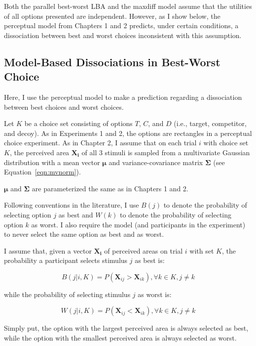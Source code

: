 Both the parallel best-worst LBA and the maxdiff model assume that the utilities of all options presented are independent. However, as I show below, the perceptual model from Chapters 1 and 2 predicts, under certain conditions, a dissociation between best and worst choices inconsistent with this assumption.

\subsection{Model-Based Dissociations in Best-Worst Choice}

Here, I use the perceptual model to make a prediction regarding a dissociation between best choices and worst choices. 

Let $K$ be a choice set consisting of options $T$, $C$, and $D$ (i.e., target, competitor, and decoy). As in Experiments 1 and 2, the options are rectangles in a perceptual choice experiment. As in Chapter 2, I assume that on each trial $i$ with choice set $K$, the perceived area $\mathbf{X_{i}}$ of all 3 stimuli is sampled from a multivariate Gaussian distribution with a mean vector $\boldsymbol{\mu}$ and variance-covariance matrix $\boldsymbol{\Sigma}$ (see Equation~\ref{eqn:mvnorm}).

$\boldsymbol{\mu}$ and $\boldsymbol{\Sigma}$ are parameterized the same as in Chapters 1 and 2. 

Following conventions in the literature, I use $B(j)$ to denote the probability of selecting option $j$ as best and $W(k)$ to denote the probability of selecting option $k$ as worst. I also require the model (and participants in the experiment) to never select the same option as best and as worst.

I assume that, given a vector $\mathbf{X_{i}}$ of perceived areas on trial $i$ with set $K$, the probability a participant selects stimulus $j$ as best is:

\begin{equation}
   B(j|i,K)=P(\mathbf{X}_{ij}>\mathbf{X}_{ik}), \forall k \in K, j \neq k
   \label{eqn:bchoice1}
\end{equation}

while the probability of selecting stimulus $j$ as worst is:

\begin{equation}
   W(j|i,K)=P(\mathbf{X}_{ij}<\mathbf{X}_{ik}), \forall k \in K, j \neq k
   \label{eqn:wchoice1}
\end{equation}

Simply put, the option with the largest perceived area is always selected as best, while the option with the smallest perceived area is always selected as worst. 


